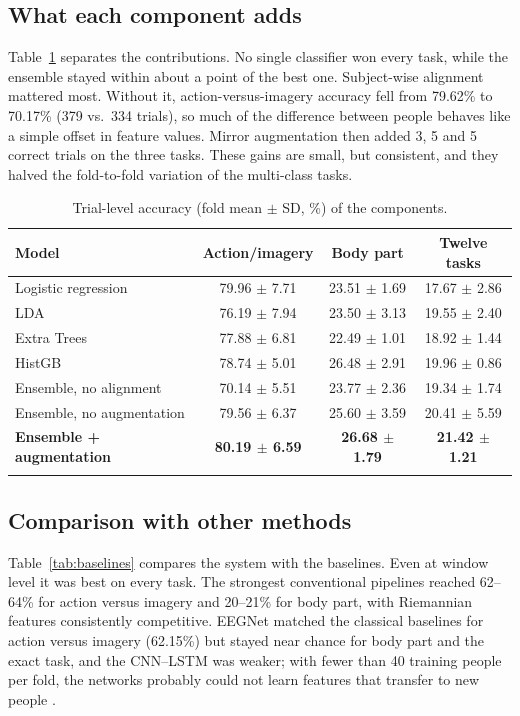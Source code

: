 \documentclass[pdflatex,sn-mathphys-num]{sn-jnl}%
\theoremstyle{thmstyleone}%
\theoremstyle{thmstyletwo}%
\theoremstyle{thmstylethree}%
\begin{document}
\subsection{What each component adds}
Table~\ref{tab:ablation} separates the contributions. No single classifier won every task, while the ensemble stayed within about a point of the best one. Subject-wise alignment mattered most. Without it, action-versus-imagery accuracy fell from 79.62\% to 70.17\% (379 vs.\ 334 trials), so much of the difference between people behaves like a simple offset in feature values. Mirror augmentation then added 3, 5 and 5 correct trials on the three tasks. These gains are small, but consistent, and they halved the fold-to-fold variation of the multi-class tasks.

\begin{table}[!htbp]
\centering
\caption{Trial-level accuracy (fold mean $\pm$ SD, \%) of the components.}
\label{tab:ablation}
\footnotesize
\begin{tabular}{@{}lccc@{}}
\toprule
Model & Action/imagery & Body part & Twelve tasks \\
\midrule
Logistic regression & 79.96 $\pm$ 7.71 & 23.51 $\pm$ 1.69 & 17.67 $\pm$ 2.86 \\
LDA & 76.19 $\pm$ 7.94 & 23.50 $\pm$ 3.13 & 19.55 $\pm$ 2.40 \\
Extra Trees & 77.88 $\pm$ 6.81 & 22.49 $\pm$ 1.01 & 18.92 $\pm$ 1.44 \\
HistGB & 78.74 $\pm$ 5.01 & 26.48 $\pm$ 2.91 & 19.96 $\pm$ 0.86 \\
Ensemble, no alignment & 70.14 $\pm$ 5.51 & 23.77 $\pm$ 2.36 & 19.34 $\pm$ 1.74 \\
Ensemble, no augmentation & 79.56 $\pm$ 6.37 & 25.60 $\pm$ 3.59 & 20.41 $\pm$ 5.59 \\
\textbf{Ensemble + augmentation} & \textbf{80.19 $\pm$ 6.59} & \textbf{26.68 $\pm$ 1.79} & \textbf{21.42 $\pm$ 1.21} \\
\botrule
\end{tabular}
\end{table}

\subsection{Comparison with other methods}
Table~\ref{tab:baselines} compares the system with the baselines. Even at window level it was best on every task. The strongest conventional pipelines reached 62--64\% for action versus imagery and 20--21\% for body part, with Riemannian features consistently competitive. EEGNet matched the classical baselines for action versus imagery (62.15\%) but stayed near chance for body part and the exact task, and the CNN--LSTM was weaker; with fewer than 40 training people per fold, the networks probably could not learn features that transfer to new people \citep{Roy2019}.
\end{document}
